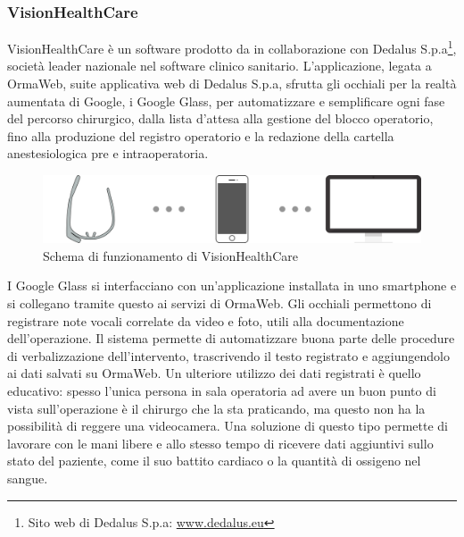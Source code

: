    \subsubsection{VisionHealthCare}
   VisionHealthCare è un software prodotto da \nomeAzienda{} in collaborazione con Dedalus S.p.a\footnote{Sito web di Dedalus S.p.a: \href{http://www.dedalus.eu}{www.dedalus.eu}}, società leader nazionale nel software clinico sanitario. L'applicazione, legata a OrmaWeb, suite applicativa web di Dedalus S.p.a, sfrutta gli occhiali per la realtà aumentata di Google, i Google Glass, per automatizzare e semplificare ogni fase del percorso chirurgico, dalla lista d'attesa alla gestione del blocco operatorio, fino alla produzione del registro operatorio e la redazione della cartella anestesiologica pre e intraoperatoria.
   \begin{figure}[H]
      \begin{center}
         \includegraphics[width=15cm,keepaspectratio]{immagini/visionhealthcare-schema}
      \end{center}
      \caption{Schema di funzionamento di VisionHealthCare}\label{schemavisionhealthcare}
   \end{figure}
   I Google Glass si interfacciano con un'applicazione installata in uno smartphone e si collegano tramite questo ai servizi di OrmaWeb.
   Gli occhiali permettono di registrare note vocali correlate da video e foto, utili alla documentazione dell'operazione. Il sistema permette di automatizzare buona parte delle procedure di verbalizzazione dell'intervento, trascrivendo il testo registrato e aggiungendolo ai dati salvati su OrmaWeb. Un ulteriore utilizzo dei dati registrati è quello educativo: spesso l'unica persona in sala operatoria ad avere un buon punto di vista sull'operazione è il chirurgo che la sta praticando, ma questo non ha la possibilità di reggere una videocamera. Una soluzione di questo tipo permette di lavorare con le mani libere e allo stesso tempo di ricevere dati aggiuntivi sullo stato del paziente, come il suo battito cardiaco o la quantità di ossigeno nel sangue.

